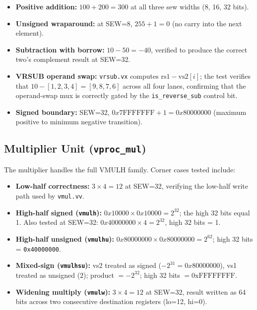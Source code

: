 \begin{itemize}
  \item \textbf{Positive addition:} $100 + 200 = 300$ at all three \gls{sew} widths
        (8, 16, 32 bits).
  \item \textbf{Unsigned wraparound:} at SEW=8, $255 + 1 = 0$ (no carry into the next
        element).
  \item \textbf{Subtraction with borrow:} $10 - 50 = -40$, verified to produce the
        correct two's complement result at SEW=32.
  \item \textbf{VRSUB operand swap:} \texttt{vrsub.vx} computes $\mathrm{rs1} -
        \mathrm{vs2}[i]$; the test verifies that $10 - [1,2,3,4] = [9,8,7,6]$ across
        all four lanes, confirming that the operand-swap mux is correctly gated by the
        \texttt{is\_reverse\_sub} control bit.
  \item \textbf{Signed boundary:} SEW=32, $0x7\mathrm{FFFFFFF} + 1 = 0x80000000$
        (maximum positive to minimum negative transition).
\end{itemize}

\subsection{Multiplier Unit (\texttt{vproc\_mul})}

The multiplier handles the full VMULH family. Corner cases tested include:

\begin{itemize}
  \item \textbf{Low-half correctness:} $3 \times 4 = 12$ at SEW=32, verifying the
        low-half write path used by \texttt{vmul.vv}.
  \item \textbf{High-half signed (\texttt{vmulh}):} $0x10000 \times 0x10000 = 2^{32}$;
        the high 32 bits equal 1. Also tested at SEW=32: $0x40000000 \times 4 = 2^{32}$,
        high 32 bits = 1.
  \item \textbf{High-half unsigned (\texttt{vmulhu}):} $0x80000000 \times 0x80000000 =
        2^{62}$; high 32 bits = \texttt{0x40000000}.
  \item \textbf{Mixed-sign (\texttt{vmulhsu}):} vs2 treated as signed ($-2^{31} =
        0x80000000$), vs1 treated as unsigned ($2$); product $= -2^{32}$; high 32 bits
        $= 0\mathrm{xFFFFFFFF}$.
  \item \textbf{Widening multiply (\texttt{vmulw}):} $3 \times 4 = 12$ at SEW=32,
        result written as 64 bits across two consecutive destination registers (lo=12,
        hi=0).
\end{itemize}


